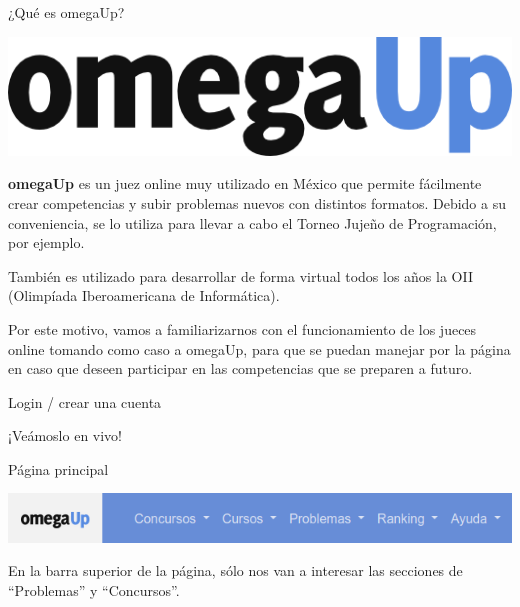 \documentclass{beamer}
\begin{document}
    \begin{frame}{¿Qué es omegaUp?}
        \begin{center}
            \href{https://omegaup.com/}{\includegraphics[width=.4\linewidth]{./omegaup_curves.png}}
        \end{center}\pause

        \textbf{omegaUp} es un juez online muy utilizado en México que permite fácilmente crear competencias y subir problemas nuevos con distintos formatos. Debido a su conveniencia, se lo utiliza para llevar a cabo el Torneo Jujeño de Programación, por ejemplo. \pause

        También es utilizado para desarrollar de forma virtual todos los años la OII (Olimpíada Iberoamericana de Informática). \pause \vspace{4pt}

        Por este motivo, vamos a familiarizarnos con el funcionamiento de los jueces online tomando como caso a omegaUp, para que se puedan manejar por la página en caso que deseen participar en las competencias que se preparen a futuro.
    \end{frame}

    \begin{frame}{Login / crear una cuenta}
        \begin{center}
            \LARGE¡Veámoslo en vivo!
        \end{center}
    \end{frame}

    \begin{frame}{Página principal}
        \begin{center}
            \includegraphics[width=.8\linewidth]{./ou_topbar.png}
        \end{center} \pause
        En la barra superior de la página, sólo nos van a interesar las secciones de ``Problemas'' y ``Concursos''.
    \end{frame}
\end{document}
